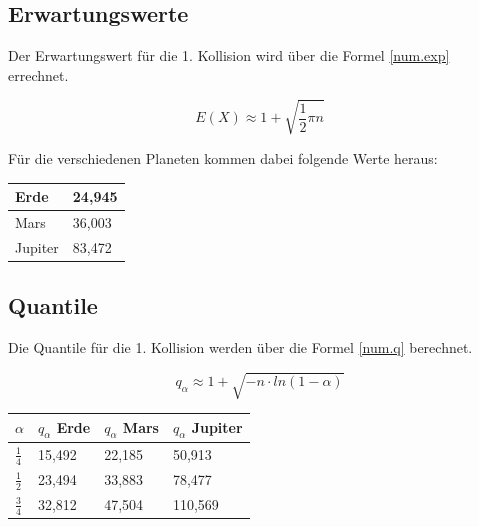 \documentclass[../main.tex]{subfiles}
\begin{document}
\subsection{Erwartungswerte}

Der Erwartungswert für die 1. Kollision wird über die Formel \ref{num.exp} errechnet.

\begin{equation}
 E(X) \approx 1 + \sqrt{\frac{1}{2} \pi n}
 \label{num.exp}
\end{equation}

Für die verschiedenen Planeten kommen dabei folgende Werte heraus:

\begin{center}
\begin{tabular}{|l|l|}
\hline
Erde & 24,945\\ \hline
Mars & 36,003\\ \hline
Jupiter & 83,472 \\ \hline
\end{tabular}
\end{center}

\subsection{Quantile}

Die Quantile für die 1. Kollision werden über die Formel \ref{num.q} berechnet.

\begin{equation}
 q_{\alpha} \approx 1 + \sqrt{-n \cdot ln(1-\alpha)}
 \label{num.q}
\end{equation}

\begin{table}[h]
\centering
\begin{tabular}{|l|l|l|l|}
\hline
$\alpha$      & $q_{\alpha}$ Erde & $q_{\alpha}$ Mars & $q_{\alpha}$ Jupiter \\ \hline
$\frac{1}{4}$ & 15,492            & 22,185            & 50,913               \\
$\frac{1}{2}$ & 23,494            & 33,883            & 78,477               \\
$\frac{3}{4}$ & 32,812            & 47,504            & 110,569              \\ \hline
\end{tabular}
\end{table}
\end{document}
